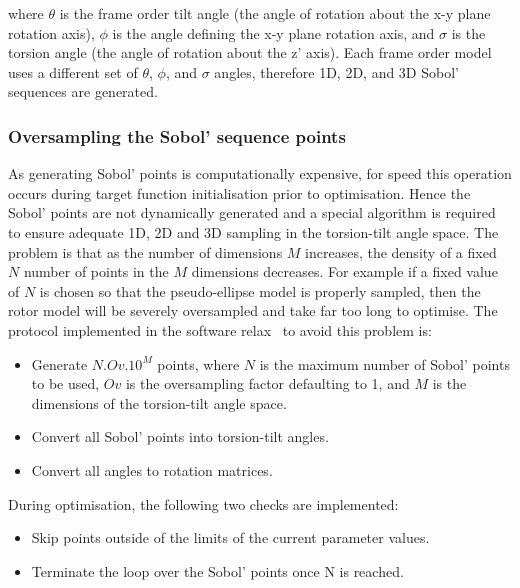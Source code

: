 where $\theta$ is the frame order tilt angle (the angle of rotation about the x-y plane rotation axis), $\phi$ is the angle defining the x-y plane rotation axis, and $\sigma$ is the torsion angle (the angle of rotation about the z' axis).
Each frame order model uses a different set of $\theta$, $\phi$, and $\sigma$ angles, therefore 1D, 2D, and 3D Sobol' sequences are generated.





\subsubsection{Oversampling the Sobol' sequence points}

As generating Sobol' points is computationally expensive, for speed this operation occurs during target function initialisation prior to optimisation.
Hence the Sobol' points are not dynamically generated and a special algorithm is required to ensure adequate 1D, 2D and 3D sampling in the torsion-tilt angle space.
The problem is that as the number of dimensions $M$ increases, the density of a fixed $N$ number of points in the $M$ dimensions decreases.
For example if a fixed value of $N$ is chosen so that the pseudo-ellipse model is properly sampled, then the rotor model will be severely oversampled and take far too long to optimise.
The protocol implemented in the software relax~\citep{dAuvergneGooley08ab} to avoid this problem is:
\begin{itemize}
    \item Generate $N.Ov.10^M$ points, where $N$ is the maximum number of Sobol' points to be used, $Ov$ is the oversampling factor defaulting to 1, and $M$ is the dimensions of the torsion-tilt angle space.
    \item Convert all Sobol' points into torsion-tilt angles.
    \item Convert all angles to rotation matrices.
\end{itemize}

During optimisation, the following two checks are implemented:
\begin{itemize}
    \item Skip points outside of the limits of the current parameter values.
    \item Terminate the loop over the Sobol' points once N is reached.
\end{itemize}

